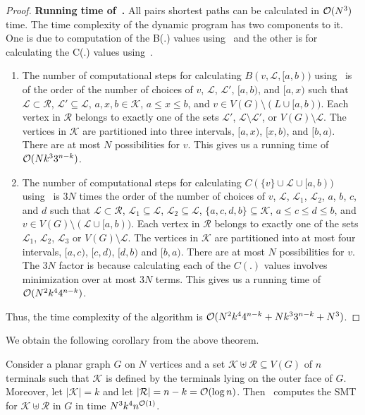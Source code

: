 \begin{proof}
{\bf Running time of~.}
All pairs shortest paths can be calculated in $\mathcal{O}(N^3)$ time. The time complexity of the dynamic program has two components to it. One is due to computation of the B(.) values using~ and the other is for calculating the C(.) values using~.
    \begin{enumerate}
        \item The number of computational steps for calculating $B(v,\mathcal{L},[a,b))$ using~ is of the order of the number of choices of $v$, $\mathcal{L}$, $\mathcal{L}'$, $[a,b)$, and $[a,x)$ such that $\mathcal{L} \subset \mathcal{R}$, $\mathcal{L}' \subseteq \mathcal{L}$, $a,x,b \in \mathcal{K}$, $a \leq x \leq b$, and $v \in V(G) \setminus (L \cup [a,b))$. Each vertex in $\mathcal{R}$ belongs to exactly one of the sets $\mathcal{L}'$, $\mathcal{L}\setminus \mathcal{L}'$, or $V(G) \setminus \mathcal{L}$. The vertices in $\mathcal{K}$ are partitioned into three intervals, $[a,x)$, $[x,b)$, and $[b,a)$. There are at most $N$ possibilities for $v$. This gives us a running time of $\mathcal{O}(Nk^3 3^{n-k})$.
        \item The number of computational steps for calculating $C(\{v\} \cup \mathcal{L} \cup [a,b))$ using~ is $3N$ times the order of the number of choices of $v$, $\mathcal{L}$, $\mathcal{L}_1$, $\mathcal{L}_2$, $a$, $b$, $c$, and $d$ such that $\mathcal{L} \subset \mathcal{R}$, $\mathcal{L}_1 \subseteq \mathcal{L}$, $\mathcal{L}_2 \subseteq \mathcal{L}$, $\{a,c,d,b\} \subseteq \mathcal{K}$, $a \leq c \leq d \leq b$, and $v \in V(G) \setminus (\mathcal{L} \cup [a,b))$. Each vertex in $\mathcal{R}$ belongs to exactly one of the sets $\mathcal{L}_1$, $\mathcal{L}_2$, $\mathcal{L}_3$ or $V(G) \setminus \mathcal{L}$. The vertices in $\mathcal{K}$ are partitioned into at most four intervals, $[a,c)$, $[c,d)$, $[d,b)$ and $[b,a)$. There are at most $N$ possibilities for $v$. The $3N$ factor is because calculating each of the $C(.)$ values involves minimization over at most $3N$ terms. This gives us a running time of $\mathcal{O}(N^2k^4 4^{n-k})$.
    \end{enumerate}
    Thus, the time complexity of the algorithm is $\mathcal{O}(N^2k^44^{n-k}+Nk^33^{n-k}+N^3)$.
\end{proof}
We obtain the following corollary from the above theorem.

\begin{corollary}\label{graph-correct}
 Consider a planar graph $G$ on $N$ vertices and a set $\mathcal{K} \uplus \mathcal{R} \subseteq V(G)$ of $n$ terminals such that $\mathcal{K}$ is defined by the terminals lying on the outer face of $G$. Moreover, let $|\mathcal{K}| = k$ and let $|\mathcal{R}| = n-k = \mathcal{O}(\log n)$. Then~ computes the SMT for $\mathcal{K} \uplus \mathcal{R}$ in $G$ in time $N^3k^4n^{\mathcal{O}(1)}$.
\end{corollary}

